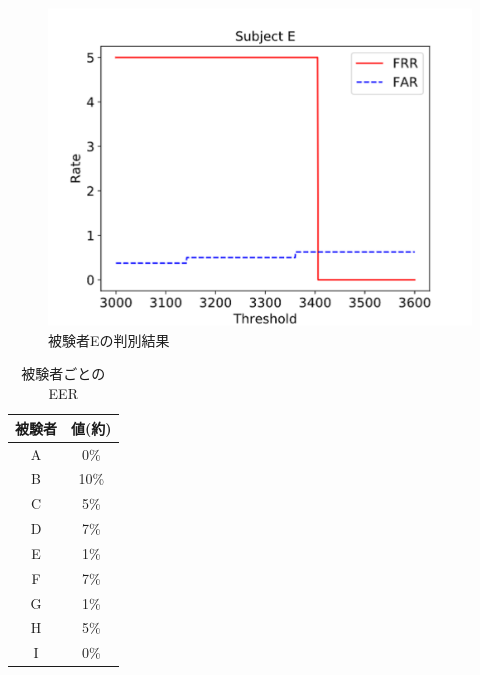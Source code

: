 \documentclass[Japanese]{dicomopapers}
\begin{document}
\begin{figure}[!t]
  \begin{center}
    \includegraphics[width=1\linewidth]{figure/subject_E.eps}
  \end{center}
    \vspace{-8mm}
  \caption{被験者Eの判別結果}
  \label{subject_E}
\end{figure}

\begin{table}[htb]
  \center
  \begin{tabular}{|c|c|} \hline
    被験者 & 値(約) \\ \hline
    A & 0\% \\
    B & 10\% \\
    C & 5\% \\
    D & 7\% \\
    E & 1\% \\
    F & 7\% \\
    G & 1\% \\
    H & 5\% \\
    I & 0\% \\ \hline
  \end{tabular}
  \caption{被験者ごとのEER}
  \label{EER_num}
\end{table}
\end{document}
